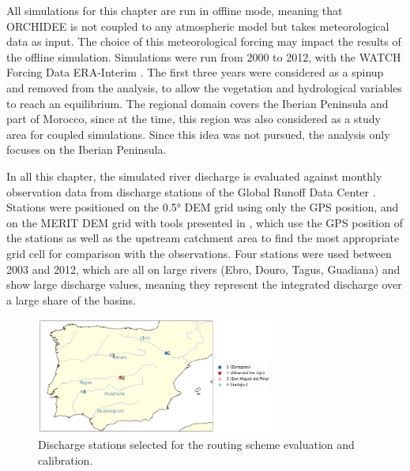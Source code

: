 All simulations for this chapter are run in offline mode, meaning that ORCHIDEE is not coupled to any atmospheric model but takes meteorological data as input. The choice of this meteorological forcing may impact the results of the offline simulation.
Simulations were run from 2000 to 2012, with the WATCH Forcing Data ERA-Interim \citep[WFDEI, ][]{weedon_wfdei_2014}. %
The first three years were considered as a spinup and removed from the analysis, to allow the vegetation and hydrological variables to reach an equilibrium. The regional domain covers the Iberian Peninsula and part of Morocco, since at the time, this region was also considered as a study area for coupled simulations. Since this idea was not pursued, the analysis only focuses on the Iberian Peninsula.

In all this chapter, the simulated river discharge is evaluated against monthly observation data from discharge stations of the Global Runoff Data Center \cite[GRDC, https://grdc.bafg.de,][]{fekete_global_2003}.
Stations were positioned on the 0.5° DEM grid using only the GPS position, and on the MERIT DEM grid with tools presented in \cite{polcher_hydrological_2023}, which use the GPS position of the stations as well as the upstream catchment area to find the most appropriate grid cell for comparison with the observations. 
Four stations were used between 2003 and 2012, which are all on large rivers (Ebro, Douro, Tagus, Guadiana) and show large discharge values, meaning they represent the integrated discharge over a large share of the basins. 

\begin{figure}[htbp]
    \centering
    \includegraphics[width=0.7\textwidth]{images/chap3/river_discharge/halfdeg_4stations_map.png}
    \caption{Discharge stations selected for the routing scheme evaluation and calibration.}
    \label{fig:halfedg_stations_map}
\end{figure}


